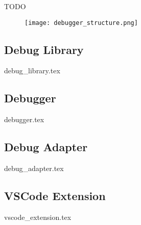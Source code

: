  

TODO

\begin{figure}[h]
    \centering
    \texttt{[image: debugger\_structure.png]}
    \label{fig:EDBStruct}
\end{figure}

\subsection{Debug Library}
{debug_library.tex}

\subsection{Debugger}
{debugger.tex}

\subsection{Debug Adapter}
{debug_adapter.tex}

\subsection{VSCode Extension}
{vscode_extension.tex}

